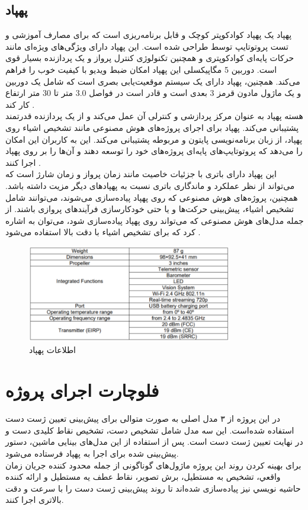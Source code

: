 \subsection{پهپاد }
پهپاد  یک پهپاد کوادکوپتر کوچک و قابل برنامه‌ریزی است که برای مصارف آموزشی و تست پروتوتایپ توسط  طراحی شده است. این پهپاد دارای ویژگی‌های ویژه‌ای مانند حرکات پایه‌ای کوادکوپتری و همچنین تکنولوژی 
کنترل پرواز  و یک پردازنده  بسیار قوی است. دوربین 5 مگاپیکسلی این پهپاد امکان ضبط ویدیو با کیفیت خوب را فراهم می‌کند. همچنین، پهپاد دارای یک سیستم موقعیت‌یابی بصری است که شامل 
یک دوربین و یک ماژول مادون قرمز 3 بعدی است و قادر است در فواصل 3.0 متر تا 30 متر ارتفاع کار کند .
\\
هسته پهپاد به عنوان مرکز پردازشی و کنترلی آن عمل می‌کند و از یک پردازنده  قدرتمند پشتیبانی می‌کند. پهپاد  برای اجرای پروژه‌های هوش مصنوعی مانند تشخیص اشیاء روی پهپاد، از زبان 
برنامه‌نویسی پایتون و  مربوطه پشتیبانی می‌کند. این  به کاربران این امکان را می‌دهد که پروتوتایپ‌های پایه‌ای پروژه‌های خود را توسعه دهند و آن‌ها را بر روی پهپاد اجرا کنند .
\\
این پهپاد دارای باتری با جزئیات خاصیت مانند زمان پرواز و زمان شارژ است که می‌تواند از نظر عملکرد و ماندگاری باتری نسبت به پهپاد‌های دیگر مزیت داشته باشد. همچنین، پروژه‌های هوش مصنوعی که روی پهپاد  پیاده‌سازی می‌شوند، 
می‌توانند شامل تشخیص اشیاء، پیش‌بینی حرکت‌ها و یا حتی خودکارسازی فرآیندهای پروازی باشند. از جمله مدل‌های هوش مصنوعی که می‌تواند روی پهپاد  پیاده‌سازی شود، می‌توان به  اشاره کرد که برای تشخیص اشیاء با دقت بالا استفاده می‌شود \cite{bhujbal2022custom}.

\begin{figure}[h]
    \centering
    \includegraphics[width=0.8\textwidth]{table.png}
    \caption{اطلاعات پهپاد }
\end{figure}


\section{فلوچارت اجرای پروژه}
در این پروژه از ۳ مدل اصلی به صورت متوالی برای پیش‌بینی تعیین ژست دست استفاده شده‌است. این سه مدل شامل تشخیص دست، تشخیص نقاط کلیدی دست و در نهایت تعیین ژست دست است. پس از استفاده از این مدل‌های بینایی ماشین، دستور پیش‌بینی شده برای اجرا به پهپاد  فرستاده می‌شود.
\\
برای بهینه کردن روند این پروژه ماژول‌های گوناگونی از جمله محدود كننده جريان زمان واقعي، تشخيص به مستطيل، برش تصوير، نقاط عطف يه مستطيل و ارائه كننده حاشيه نويسي نیز پیاده‌سازی شده‌اند تا روند پیش‌بینی ژست دست را با سرعت و دقت بالاتری اجرا کنند.

